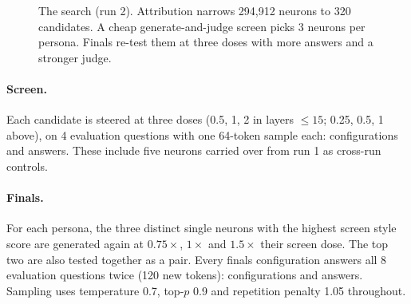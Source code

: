\documentclass[11pt]{article}
\begin{document}
\begin{figure}[t]
\centering
{}
\caption{The search (run 2). Attribution narrows 294,912 neurons to 320 candidates. A cheap generate-and-judge screen picks 3 neurons per persona. Finals re-test them at three doses with more answers and a stronger judge.}
\label{fig:pipeline}
\end{figure}

\paragraph{Screen.} Each candidate is steered at three doses (0.5, 1, 2 in layers $\le 15$; 0.25, 0.5, 1 above), on 4 evaluation questions with one 64-token sample each: \nScreenCfg{} configurations and \nScreenItems{} answers. These include five neurons carried over from run 1 as cross-run controls.

\paragraph{Finals.} For each persona, the three distinct single neurons with the highest screen style score are generated again at $0.75\times$, $1\times$ and $1.5\times$ their screen dose. The top two are also tested together as a pair. Every finals configuration answers all 8 evaluation questions twice (120 new tokens): \nFinalsCfg{} configurations and \nFinalsItems{} answers. Sampling uses temperature 0.7, top-$p$ 0.9 and repetition penalty 1.05 throughout.
\end{document}
